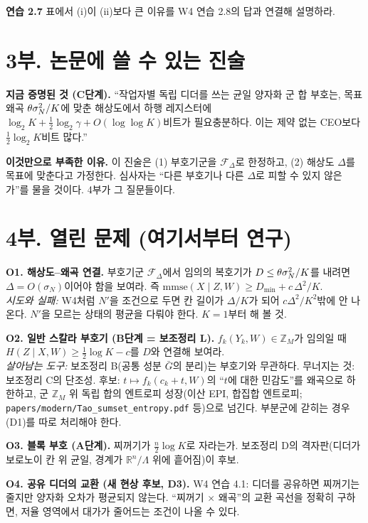 \textbf{연습 2.7} 표에서 (i)이 (ii)보다 큰 이유를 W4 연습 2.8의 답과 연결해 설명하라. \vspace{3em}

\section*{3부. 논문에 쓸 수 있는 진술}
\begin{bridge}
\textbf{지금 증명된 것 (C단계).} “작업자별 독립 디더를 쓰는 균일 양자화 군 합 부호는, 목표 왜곡 $\theta\sigma_N^2/K$에 맞춘 해상도에서 하행 레지스터에 $\log_2K+\frac12\log_2\gamma+O(\log\log K)$비트가 필요충분하다. 이는 제약 없는 CEO보다 $\frac12\log_2K$비트 많다.”

\textbf{이것만으로 부족한 이유.} 이 진술은 (1) 부호기군을 $\mathcal F_\Delta$로 한정하고, (2) 해상도 $\Delta$를 목표에 맞춘다고 가정한다. 심사자는 “다른 부호기나 다른 $\Delta$로 피할 수 있지 않은가”를 물을 것이다. 4부가 그 질문들이다.
\end{bridge}

\section*{4부. 열린 문제 (여기서부터 연구)}
\begin{openprob}
\textbf{O1. 해상도–왜곡 연결.} 부호기군 $\mathcal F_\Delta$에서 임의의 복호기가 $D\le\theta\sigma_N^2/K$를 내려면 $\Delta=O(\sigma_N)$이어야 함을 보여라. 즉 $\mathrm{mmse}(X\mid Z,W)\ge D_{\min}+c\,\Delta^2/K$.\\
\emph{시도와 실패:} W4처럼 $N'$을 조건으로 두면 칸 길이가 $\Delta/K$가 되어 $c\Delta^2/K^2$밖에 안 나온다. $N'$을 모르는 상태의 평균을 다뤄야 한다. $K=1$부터 해 볼 것.

\textbf{O2. 일반 스칼라 부호기 (B단계 = 보조정리 L).} $f_k(Y_k,W)\in\mathbb Z_M$가 임의일 때 $H(Z\mid X,W)\ge\frac12\log K-c$를 $D$와 연결해 보여라.\\
\emph{살아남는 도구:} 보조정리 B(공통 성분 $\bar G$의 분리)는 부호기와 무관하다. 무너지는 것: 보조정리 C의 단조성. 후보: $t\mapsto f_k(c_k+t,W)$의 “$t$에 대한 민감도”를 왜곡으로 하한하고, 군 $\mathbb Z_M$ 위 독립 합의 엔트로피 성장(이산 EPI, 합집합 엔트로피; \texttt{papers/modern/Tao\_sumset\_entropy.pdf} 등)으로 넘긴다. 부분군에 갇히는 경우(D1)를 따로 처리해야 한다.

\textbf{O3. 블록 부호 (A단계).} 찌꺼기가 $\frac n2\log K$로 자라는가. 보조정리 D의 격자판(디더가 보로노이 칸 위 균일, 경계가 $\mathbb R^n/\Lambda$ 위에 흩어짐)이 후보.

\textbf{O4. 공유 디더의 교환 (새 현상 후보, D3).} W4 연습 4.1: 디더를 공유하면 찌꺼기는 줄지만 양자화 오차가 평균되지 않는다. “찌꺼기 $\times$ 왜곡”의 교환 곡선을 정확히 구하면, 저율 영역에서 대가가 줄어드는 조건이 나올 수 있다.
\end{openprob}


